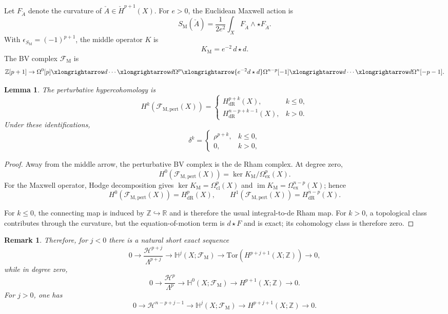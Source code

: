 \documentclass[12pt]{amsart}
\numberwithin{table}{section}
\numberwithin{equation}{section}
\newtheorem{rmk}{Remark}[section]
\newtheorem{lem}{Lemma}[section]
\theoremstyle{plain}
\newcommand{\sF}{\mathcal{F}}
\newcommand{\R}{\mathbb{R}}
\newcommand{\Hq}{\mathbb{H}}
\newcommand{\Z}{\mathbb{Z}}
\newcommand{\Tor}{\mathrm{Tor}}
\begin{document}
Let $F_{\check A}$ denote the curvature of $\check{A} \in \check{H}^{p+1}(X)$. For $e>0$, the Euclidean Maxwell action is
\[
S_{\mathrm{M}}(\check A)
=
\frac{1}{2 e^2}
\int_X F_{\check A}\wedge \star F_{\check A}.
\]
With $\epsilon_{S_{\mathrm{M}}}=(-1)^{p+1}$, the middle operator $K$ is 
\[
K_{\mathrm M}= e^{-2}\,d\star d.
\]
The BV complex $\sF_{\mathrm M}$ is
\begin{equation*}
\Z[p+1]\rightarrow
\Omega^0[p]\xlongrightarrow d\cdots\xlongrightarrow d
\Omega^p
\xlongrightarrow{e^{-2}d\star d}
\Omega^{n-p}[-1]\xlongrightarrow d\cdots\xlongrightarrow d
\Omega^n[-p-1].
\end{equation*}

\begin{lem}
The perturbative hypercohomology is
\[
H^k(\sF_{\mathrm M, \mathrm{pert}}(X)) =
\begin{cases}
H^{p+k}_{\mathrm{dR}}(X),&k \leq 0,\\
H^{n-p+k-1}_{\mathrm{dR}}(X),&k >0.
\end{cases}
\]
Under these identifications,
\[
\delta^k=
\begin{cases}
\rho^{p+k},&k\le0,\\
0,&k>0,
\end{cases}
\]

\end{lem}

\begin{proof}
Away from the middle arrow, the perturbative BV complex is the de Rham complex. At degree zero,
\[
H^0(\sF_{\mathrm M, \mathrm{pert}}(X))
=\ker K_{\mathrm M}/\Omega^p_{\mathrm{ex}}(X).
\]
For the Maxwell operator, Hodge decomposition gives $\ker K_{\mathrm M}=\Omega^p_{\mathrm{cl}}(X)$ and $\operatorname{im} K_{\mathrm M} = \Omega^{n-p}_{\mathrm{ex}}(X)$; hence
\[
H^0(\sF_{\mathrm M, \mathrm{pert}}(X))= H^p_{\mathrm{dR}}(X), \qquad H^1(\sF_{\mathrm M, \mathrm{pert}}(X))= H^{n-p}_{\mathrm{dR}}(X).
\]

For $k \leq 0$, the connecting map is induced by $\Z\hookrightarrow\R$ and is therefore the usual integral-to-de Rham map. For $k > 0$, a topological class contributes through the curvature, but the equation-of-motion term is $d \star F$ and is exact; its cohomology class is therefore zero. 
\end{proof}

\begin{rmk}
	Therefore, for $j<0$ there is a natural short exact sequence
	\[
	0\longrightarrow
	\frac{\mathcal H^{p+j}}{\Lambda^{p+j}}
	\longrightarrow
	\Hq^j(X;\sF_{\mathrm M})
	\longrightarrow
	\Tor(H^{p+j+1}(X;\Z))
	\longrightarrow 0,
	\]
	while in degree zero,
	\[
	0\longrightarrow
	\frac{\mathcal H^p}{\Lambda^p}
	\longrightarrow
	\Hq^0(X;\sF_{\mathrm M})
	\longrightarrow
	H^{p+1}(X;\Z)
	\longrightarrow 0.
	\]
	For $j>0$, one has
	\[
	0\longrightarrow
	\mathcal H^{n-p+j-1}
	\longrightarrow
	\Hq^j(X;\sF_{\mathrm M})
	\longrightarrow
	H^{p+j+1}(X;\Z)
	\longrightarrow 0.
	\]
\end{rmk}
\end{document}
